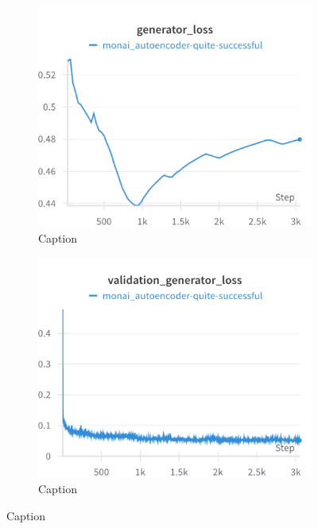 \begin{figure}[H]
\centering
\begin{subfigure}[h]{.45\linewidth}
    \includegraphics[width=\linewidth]{detailed_engineering/Monai Autoencoder/charts/generator_loss.png}
    \caption{Caption}
    \label{fig:enter-label}
\end{subfigure}
\hfill
\begin{subfigure}[h]{.45\linewidth}
    \includegraphics[width=\linewidth]{detailed_engineering/Monai Autoencoder/charts/val_generator_loss.png}
    \caption{Caption}
    \label{fig:enter-label}
\end{subfigure}

\end{figure}
